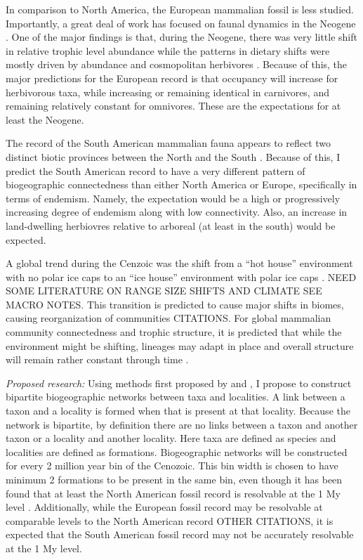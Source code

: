 \documentclass[12pt,letterpaper]{article}
\begin{document}
In comparison to North America, the European mammalian fossil is less studied. Importantly, a great deal of work has focused on faunal dynamics in the Neogene \citep{Jernvall2002,Jernvall2004,Liow2008,Raia2006,Raia2005,Raia2011c}. One of the major findings is that, during the Neogene, there was very little shift in relative trophic level abundance \citep{Jernvall2004} while the patterns in dietary shifts were mostly driven by abundance and cosmopolitan herbivores \citep{Jernvall2002}. Because of this, the major predictions for the European record is that occupancy will increase for herbivorous taxa, while increasing or remaining identical in carnivores, and remaining relatively constant for omnivores. These are the expectations for at least the Neogene.

The record of the South American mammalian fauna appears to reflect two distinct biotic provinces between the North and the South \citep{Macfadden1997,Macfadden2006,Flynn1998a,Patterson1968}. Because of this, I predict the South American record to have a very different pattern of biogeographic connectedness than either North America or Europe, specifically in terms of endemism. Namely, the expectation would be a high or progressively increasing degree of endemism along with low connectivity. Also, an increase in land-dwelling herbiovres relative to arboreal (at least in the south) would be expected.

A global trend during the Cenzoic was the shift from a ``hot house'' environment with no polar ice caps to an ``ice house'' environment with polar ice caps \citep{Zachos2008,Zachos2001}. NEED SOME LITERATURE ON RANGE SIZE SHIFTS AND CLIMATE SEE MACRO NOTES. This transition is predicted to cause major shifts in biomes, causing reorganization of communities CITATIONS. For global mammalian community connectedness and trophic structure, it is predicted that while the environment might be shifting, lineages may adapt in place and overall structure will remain rather constant through time \citep{Jernvall2004}.

\textit{Proposed research:}
Using methods first proposed by \citet{Sidor2013} and \citet{Vilhena2013}, I propose to construct bipartite biogeographic networks between taxa and localities. A link between a taxon and a locality is formed when that is present at that locality. Because the network is bipartite, by definition there are no links between a taxon and another taxon or a locality and another locality. Here taxa are defined as species and localities are defined as formations. Biogeographic networks will be constructed for every 2 million year bin of the Cenozoic. This bin width is chosen to have minimum 2 formations to be present in the same bin, even though it has been found that at least the North American fossil record is resolvable at the 1 My level \citep{Alroy2000a,Alroy1996a,Alroy1998}. Additionally, while the European fossil record may be resolvable at comparable levels to the North American record \citep{Jernvall2002,Jernvall2004} OTHER CITATIONS, it is expected that the South American fossil record may not be accurately resolvable at the 1 My level.
\end{document}
